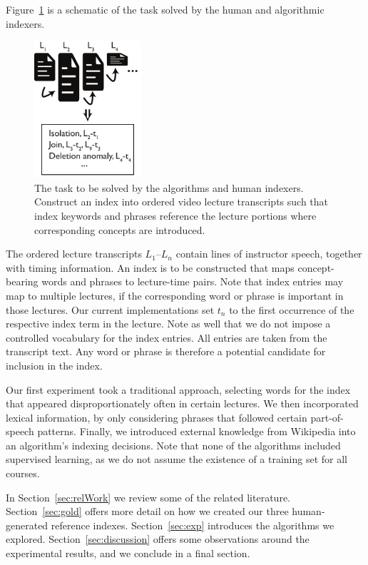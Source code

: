 Figure~\ref{fig:task} is a schematic of the task solved by the human
and algorithmic indexers.
\begin{figure}[htp]
       \centering
       \includegraphics[height=2in]{indexingTask.pdf}
       \caption{\textnormal{The task to be solved by the algorithms
           and human indexers. Construct an index into ordered video
           lecture transcripts such that index keywords and phrases
           reference the lecture portions where corresponding concepts
           are introduced.}}
       \label{fig:task}
\end{figure}

The ordered lecture transcripts $L_1$--$L_n$ contain lines of
instructor speech, together with timing information. An index is to be
constructed that maps concept-bearing words and phrases to
lecture-time pairs. Note that index entries may map to multiple
lectures, if the corresponding word or phrase is important in those
lectures. Our current implementations set $t_n$ to the first
occurrence of the respective index term in the lecture.
Note as well that we do not impose a controlled vocabulary for the
index entries. All entries are taken from the transcript text. Any
word or phrase is therefore a potential candidate for inclusion in the
index. 

Our first experiment took a traditional approach, selecting words for
the index that appeared disproportionately often in certain
lectures. We then incorporated lexical information, by only
considering phrases that followed certain part-of-speech
patterns. Finally, we introduced external knowledge from Wikipedia
into an algorithm's indexing decisions. Note that none of the
algorithms included supervised learning, as we do not assume the
existence of a training set for all courses.

In Section~\ref{sec:relWork} we review some of the related
literature. Section~\ref{sec:gold} offers more detail on how we
created our three human-generated reference
indexes. Section~\ref{sec:exp} introduces the algorithms we
explored. Section~\ref{sec:discussion} offers some observations around
the experimental results, and we conclude in a final section.


